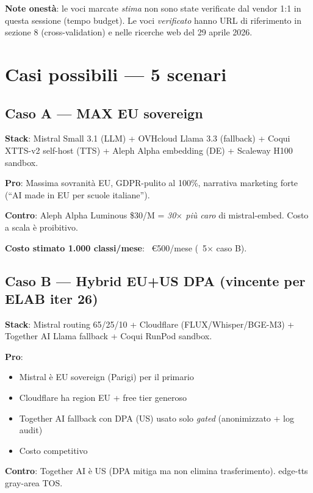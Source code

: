 \documentclass[12pt,a4paper]{article}
\begin{document}
\textbf{Note onestà}: le voci marcate \emph{stima} non sono state verificate dal vendor 1:1 in questa sessione (tempo budget). Le voci \emph{verificato} hanno URL di riferimento in sezione 8 (cross-validation) e nelle ricerche web del 29 aprile 2026.

\newpage

\section{Casi possibili --- 5 scenari}

\subsection{Caso A --- MAX EU sovereign}

\textbf{Stack}: Mistral Small 3.1 (LLM) + OVHcloud Llama 3.3 (fallback) + Coqui XTTS-v2 self-host (TTS) + Aleph Alpha embedding (DE) + Scaleway H100 sandbox.

\textbf{Pro}: Massima sovranità EU, GDPR-pulito al 100\%, narrativa marketing forte (``AI made in EU per scuole italiane'').

\textbf{Contro}: Aleph Alpha Luminous \$30/M = \emph{30$\times$ più caro} di mistral-embed. Costo a scala è proibitivo.

\textbf{Costo stimato 1.000 classi/mese}: ~€500/mese (~5$\times$ caso B).

\subsection{Caso B --- Hybrid EU+US DPA (vincente per ELAB iter 26)}

\textbf{Stack}: Mistral routing 65/25/10 + Cloudflare (FLUX/Whisper/BGE-M3) + Together AI Llama fallback + Coqui RunPod sandbox.

\textbf{Pro}:
\begin{itemize}
  \item Mistral è EU sovereign (Parigi) per il primario
  \item Cloudflare ha region EU + free tier generoso
  \item Together AI fallback con DPA (US) usato solo \emph{gated} (anonimizzato + log audit)
  \item Costo competitivo
\end{itemize}

\textbf{Contro}: Together AI è US (DPA mitiga ma non elimina trasferimento). edge-tts gray-area TOS.
\end{document}
